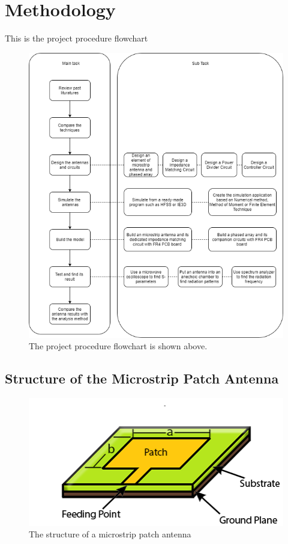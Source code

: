 \documentclass[11pt,a4paper,hidelinks]{article}
\begin{document}
  \section{Methodology}
    \indent This is the project procedure flowchart
    \begin{figure}[ht]
      \includegraphics{flowchart_ml.png}
        \centering
        \caption{The project procedure flowchart is shown above.}
    \end{figure}
    
    \newpage
    
    \subsection{Structure of the Microstrip Patch Antenna}
      \begin{figure}[ht]
        \includegraphics{selfmadepatch.png}
          \centering
          \caption{The structure of a microstrip patch antenna}
      \end{figure}
      
\end{document}
